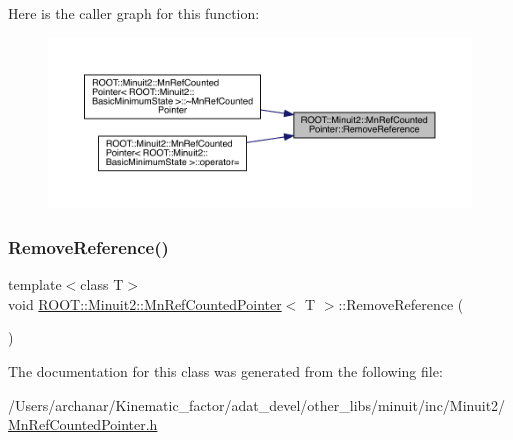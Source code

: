Here is the caller graph for this function\+:\nopagebreak
\begin{figure}[H]
\begin{center}
\leavevmode
\includegraphics[width=350pt]{d5/d13/classROOT_1_1Minuit2_1_1MnRefCountedPointer_a8e348ffb51b9ed7793cce28e6330309f_icgraph}
\end{center}
\end{figure}
\mbox{\label{classROOT_1_1Minuit2_1_1MnRefCountedPointer_a8e348ffb51b9ed7793cce28e6330309f}} 
\subsubsection{\texorpdfstring{RemoveReference()}{RemoveReference()}\hspace{0.1cm}{\footnotesize\ttfamily [2/2]}}
{\footnotesize\ttfamily template$<$class T$>$ \\
void \mbox{\hyperlink{classROOT_1_1Minuit2_1_1MnRefCountedPointer}{R\+O\+O\+T\+::\+Minuit2\+::\+Mn\+Ref\+Counted\+Pointer}}$<$ T $>$\+::Remove\+Reference (\begin{DoxyParamCaption}{ }\end{DoxyParamCaption})\hspace{0.3cm}{\ttfamily [inline]}}



The documentation for this class was generated from the following file\+:\begin{DoxyCompactItemize}
\item 
/\+Users/archanar/\+Kinematic\+\_\+factor/adat\+\_\+devel/other\+\_\+libs/minuit/inc/\+Minuit2/\mbox{\hyperlink{other__libs_2minuit_2inc_2Minuit2_2MnRefCountedPointer_8h}{Mn\+Ref\+Counted\+Pointer.\+h}}\end{DoxyCompactItemize}
